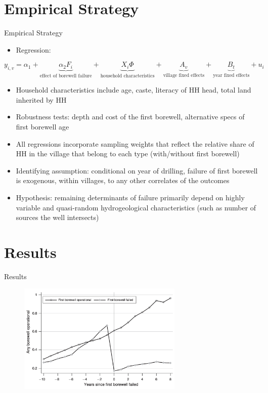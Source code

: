 \documentclass[10pt]{beamer}
\begin{document}
\section{Empirical Strategy}
\begin{frame}
	{Empirical Strategy}
	\begin{itemize}
		\item Regression:
	\end{itemize}
	\begin{equation}
		y_{i,v} = \alpha_1 + \underbrace{\alpha_2 F_i}_{\text{effect of borewell failure}} + \underbrace{X_i \Phi}_{\text{household characteristics}} + \underbrace{A_v}_{\text{village fixed effects}} + \underbrace{B_t}_{\text{year fixed effects}} + u_i
	\end{equation}
	\begin{itemize}
		\item Household characteristics include age, caste, literacy of HH head, total land inherited by HH
		\item Robustness tests: depth and cost of the first borewell, alternative specs of first borewell age
		\item All regressions incorporate sampling weights that reflect the relative share of HH in the village that belong to each type (with/without first borewell)
		\item Identifying assumption: conditional on year of drilling, failure of first borewell is exogenous, within villages, to any other correlates of the outcomes
		\item Hypothesis: remaining determinants of failure primarily depend on highly variable and quasi-random hydrogeological characteristics (such as number of sources the well intersects)
	\end{itemize}
\end{frame}


\section{Results}
\begin{frame}
	{Results}
	\begin{figure}
		\centering
		\includegraphics[width=0.7\textwidth]{figure4.png}
	\end{figure}
\end{frame}
\end{document}
